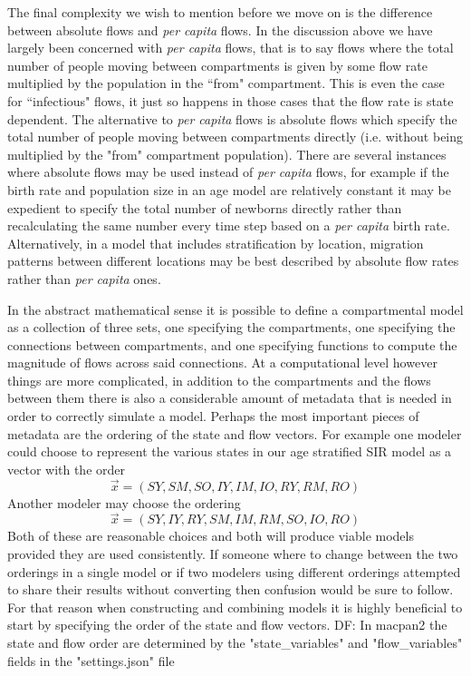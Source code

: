 \documentclass[referee,sn-basic]{sn-jnl}%
\theoremstyle{definition}
\newcommand{\df}[1]{{\color{orange} DF: #1}}
\newcommand{\xvec}{\vec{x}}
\begin{document}
The final complexity we wish to mention before we move on is the difference between absolute flows and \emph{per capita} flows. In the discussion above we have largely been concerned with \emph{per capita} flows, that is to say flows where the total number of people moving between compartments is given by some flow rate multiplied by the population in the ``from" compartment. This is even the case for ``infectious" flows, it just so happens in those cases that the flow rate is state dependent. The alternative to \emph{per capita} flows is absolute flows which specify the total number of people moving between compartments directly (i.e. without being multiplied by the "from" compartment population). There are several instances where absolute flows may be used instead of \emph{per capita} flows, for example if the birth rate and population size in an age model are relatively constant it may be expedient to specify the total number of newborns directly rather than recalculating the same number every time step based on a \emph{per capita} birth rate. Alternatively, in a model that includes stratification by location, migration patterns between different locations may be best described by absolute flow rates rather than \emph{per capita} ones.

In the abstract mathematical sense it is possible to define a compartmental model as a collection of three sets, one specifying the compartments, one specifying the connections between compartments, and one specifying functions to compute the magnitude of flows across said connections. At a computational level however things are more complicated, in addition to the compartments and the flows between them there is also a considerable amount of metadata that is needed in order to correctly simulate a model. Perhaps the most important pieces of metadata are the ordering of the state and flow vectors. For example one modeler could choose to represent the various states in our age stratified SIR model as a vector with the order 
\[
    \xvec = (SY, SM, SO, IY, IM, IO, RY, RM, RO)
\]
Another modeler may choose the ordering
\[
    \xvec = (SY, IY, RY, SM, IM, RM, SO, IO, RO)
\]
Both of these are reasonable choices and both will produce viable models provided they are used consistently. If someone where to change between the two orderings in a single model or if two modelers using different orderings attempted to share their results without converting then confusion would be sure to follow. For that reason when constructing and combining models it is highly beneficial to start by specifying the order of the state and flow vectors. \df{In macpan2 the state and flow order are determined by the "state\_variables" and "flow\_variables" fields in the "settings.json" file}
\end{document}
